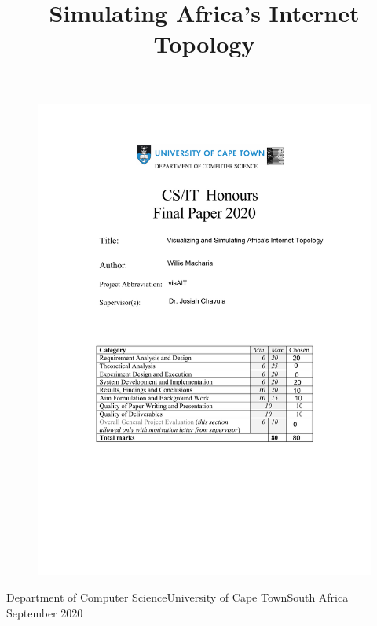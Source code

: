 \documentclass[plain]{sigplanconf}
\begin{document}
\begin{figure}
		\centering
		\includegraphics{sections/pictures-diagrams/PaperCoverSheet.pdf}
	\end{figure}
	\title{Simulating Africa's Internet Topology }
	{Department of Computer Science\linebreak University of Cape Town\linebreak South Africa}
	{September 2020}
	\maketitle
\end{document}
